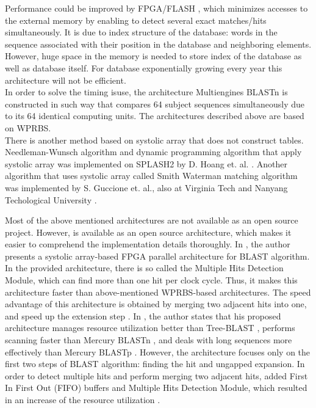 Performance could be improved by FPGA/FLASH \cite{lavenier2007reconfigurable}, which minimizes accesses to the external memory by enabling to detect several exact matches/hits simultaneously. It is due to index structure of the database: words in the sequence associated with their position in the database and neighboring elements. However, huge space in the memory is needed to store index of the database as well as database itself. For database exponentially growing every year this architecture will not be efficient. 
\\

In order to solve the timing isuse, the architecture Multiengines BLASTn \cite{sotiriades2007design} is constructed in such way that compares 64 subject sequences simultaneously due to its 64 identical computing units. The architectures described above are based on WPRBS.
\\

There is another method based on systolic array that does not construct tables. Needleman-Wunsch algorithm \cite{gonnet1992exhaustive} and dynamic programming algorithm that apply systolic array was implemented on SPLASH2 by D. Hoang et. al. \cite{hoang1993searching}. Another algorithm that uses systolic array called Smith Waterman matching algorithm was implemented by S. Guccione et. al., also at Virginia Tech and Nanyang Techological University \cite{yu2003smith}. 

Most of the above mentioned architectures are not available as an open source project. However, \cite{guo2012open} is available as an open source architecture, which makes it easier to comprehend the implementation details thoroughly. In \cite{guo2012open}, the author presents a systolic array-based FPGA parallel architecture for BLAST algorithm. In the provided architecture, there is so called the Multiple Hits Detection Module, which can find more than one hit per clock cycle. Thus, it makes this architecture faster than above-mentioned WPRBS-based architectures. The speed advantage of this architecture is obtained by merging two adjacent hits into one, and speed up the extension step \cite{guo2012open}. In \cite{guo2012open}, the author states that his proposed architecture manages resource utilization better than Tree-BLAST \cite{herbordt2006single}, performs scanning faster than Mercury BLASTn \cite{buhler2007mercury}, and deals with long sequences more effectively than Mercury BLASTp \cite{harris2007banded}. However, the architecture focuses only on the first two steps of BLAST algorithm: finding the hit and ungapped expansion. In order to detect multiple hits and perform merging two adjacent hits, \cite{guo2012open} added First In First Out (FIFO) buffers and Multiple Hits Detection Module, which resulted in an increase of the resource utilization \cite{guo2012open}.


